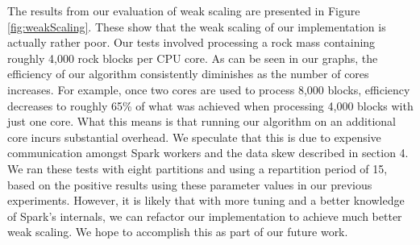 The results from our evaluation of weak scaling are presented in Figure \ref{fig:weakScaling}. These show that the weak scaling of our implementation is actually rather poor. Our tests involved processing a rock mass containing roughly 4,000 rock blocks per CPU core. As can be seen in our graphs, the efficiency of our algorithm consistently diminishes as the number of cores increases. For example, once two cores are used to process 8,000 blocks, efficiency decreases to roughly 65\% of what was achieved when processing 4,000 blocks with just one core. What this means is that running our algorithm on an additional core incurs substantial overhead. We speculate that this is due to expensive communication amongst Spark workers and the data skew described in section 4. We ran these tests with eight partitions and using a repartition period of 15, based on the positive results using these parameter values in our previous experiments. However, it is likely that with more tuning and a better knowledge of Spark's internals, we can refactor our implementation to achieve much better weak scaling. We hope to accomplish this as part of our future work.

